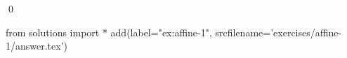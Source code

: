 
\begin{ex} 
  \label{ex:affine-1}
  
  \qed
\end{ex} 
\begin{python0}
from solutions import *
add(label="ex:affine-1",
    srcfilename='exercises/affine-1/answer.tex') 
\end{python0}
